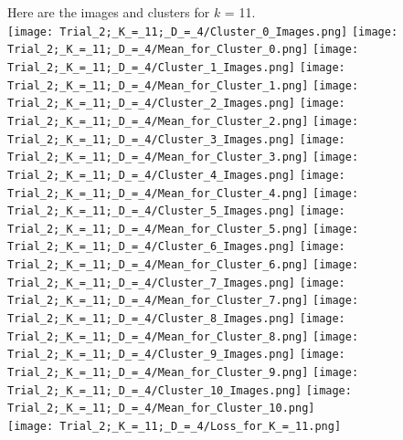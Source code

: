 \documentclass[submit]{harvardml}
\begin{document}
	Here are the images and clusters for $k$ = 11. \\
	\texttt{[image: Trial\_2;\_K\_=\_11;\_D\_=\_4/Cluster\_0\_Images.png]}
	\texttt{[image: Trial\_2;\_K\_=\_11;\_D\_=\_4/Mean\_for\_Cluster\_0.png]}
	\texttt{[image: Trial\_2;\_K\_=\_11;\_D\_=\_4/Cluster\_1\_Images.png]}
	\texttt{[image: Trial\_2;\_K\_=\_11;\_D\_=\_4/Mean\_for\_Cluster\_1.png]}
	\texttt{[image: Trial\_2;\_K\_=\_11;\_D\_=\_4/Cluster\_2\_Images.png]}
	\texttt{[image: Trial\_2;\_K\_=\_11;\_D\_=\_4/Mean\_for\_Cluster\_2.png]}
	\texttt{[image: Trial\_2;\_K\_=\_11;\_D\_=\_4/Cluster\_3\_Images.png]}
	\texttt{[image: Trial\_2;\_K\_=\_11;\_D\_=\_4/Mean\_for\_Cluster\_3.png]}
	\texttt{[image: Trial\_2;\_K\_=\_11;\_D\_=\_4/Cluster\_4\_Images.png]}
	\texttt{[image: Trial\_2;\_K\_=\_11;\_D\_=\_4/Mean\_for\_Cluster\_4.png]}
	\texttt{[image: Trial\_2;\_K\_=\_11;\_D\_=\_4/Cluster\_5\_Images.png]}
	\texttt{[image: Trial\_2;\_K\_=\_11;\_D\_=\_4/Mean\_for\_Cluster\_5.png]}
	\texttt{[image: Trial\_2;\_K\_=\_11;\_D\_=\_4/Cluster\_6\_Images.png]}
	\texttt{[image: Trial\_2;\_K\_=\_11;\_D\_=\_4/Mean\_for\_Cluster\_6.png]}
	\texttt{[image: Trial\_2;\_K\_=\_11;\_D\_=\_4/Cluster\_7\_Images.png]}
	\texttt{[image: Trial\_2;\_K\_=\_11;\_D\_=\_4/Mean\_for\_Cluster\_7.png]}
	\texttt{[image: Trial\_2;\_K\_=\_11;\_D\_=\_4/Cluster\_8\_Images.png]}
	\texttt{[image: Trial\_2;\_K\_=\_11;\_D\_=\_4/Mean\_for\_Cluster\_8.png]}
	\texttt{[image: Trial\_2;\_K\_=\_11;\_D\_=\_4/Cluster\_9\_Images.png]}
	\texttt{[image: Trial\_2;\_K\_=\_11;\_D\_=\_4/Mean\_for\_Cluster\_9.png]}
	\texttt{[image: Trial\_2;\_K\_=\_11;\_D\_=\_4/Cluster\_10\_Images.png]}
	\texttt{[image: Trial\_2;\_K\_=\_11;\_D\_=\_4/Mean\_for\_Cluster\_10.png]} \\
	\texttt{[image: Trial\_2;\_K\_=\_11;\_D\_=\_4/Loss\_for\_K\_=\_11.png]} 
	\\\\
	
\end{document}
